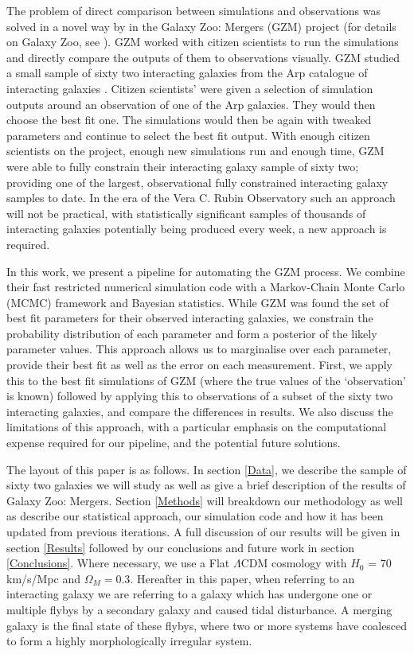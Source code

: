 The problem of direct comparison between simulations and observations was solved in a novel way by \citet{2016MNRAS.459..720H} in the Galaxy Zoo: Mergers (GZM) project (for details on Galaxy Zoo, see \citet{2008MNRAS.389.1179L}). GZM worked with citizen scientists to run the simulations and directly compare the outputs of them to observations visually. GZM studied a small sample of sixty two interacting galaxies from the Arp catalogue of interacting galaxies \citep{1966ApJS...14....1A}. Citizen scientists' were given a selection of simulation outputs around an observation of one of the Arp galaxies. They would then choose the best fit one. The simulations would then be again with tweaked parameters and continue to select the best fit output. With enough citizen scientists on the project, enough new simulations run and enough time, GZM were able to fully constrain their interacting galaxy sample of sixty two; providing one of the largest, observational fully constrained interacting galaxy samples to date. In the era of the Vera C. Rubin Observatory such an approach will not be practical, with statistically significant samples of thousands of interacting galaxies potentially being produced every week, a new approach is required.

In this work, we present a pipeline for automating the GZM process. We combine their fast restricted numerical simulation code with a Markov-Chain Monte Carlo (MCMC) framework and Bayesian statistics. While GZM was found the set of best fit parameters for their observed interacting galaxies, we constrain the probability distribution of each parameter and form a posterior of the likely parameter values. This approach allows us to marginalise over each parameter, provide their best fit as well as the error on each measurement. First, we apply this to the best fit simulations of GZM (where the true values of the `observation' is known) followed by applying this to observations of a subset of the sixty two interacting galaxies, and compare the differences in results. We also discuss the limitations of this approach, with a particular emphasis on the computational expense required for our pipeline, and the potential future solutions.

The layout of this paper is as follows. In section \ref{Data}, we describe the sample of sixty two galaxies we will study as well as give a brief description of the results of Galaxy Zoo: Mergers. Section \ref{Methods} will breakdown our methodology as well as describe our statistical approach, our simulation code and how it has been updated from previous iterations. A full discussion of our results will be given in section \ref{Results} followed by our conclusions and future work in section \ref{Conclusions}. Where necessary, we use a Flat $\Lambda$CDM cosmology with $H_0$ = $70$\,km/s/Mpc and $\Omega_M = 0.3$. Hereafter in this paper, when referring to an interacting galaxy we are referring to a galaxy which has undergone one or multiple flybys by a secondary galaxy and caused tidal disturbance. A merging galaxy is the final state of these flybys, where two or more systems have coalesced to form a highly morphologically irregular system.

